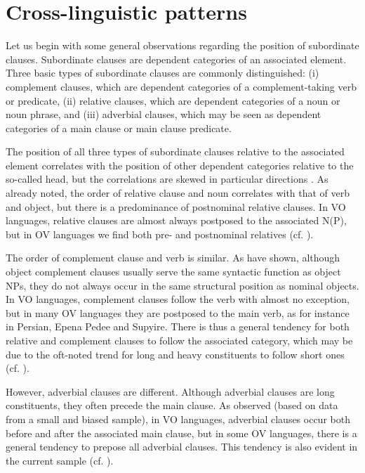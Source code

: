 \documentclass[output=paper]{langsci/langscibook}
\begin{document}
\section{Cross-linguistic patterns}

Let us begin with some general observations regarding the position of subordinate clauses. Subordinate clauses are dependent categories of an associated element. Three basic types of subordinate clauses are commonly distinguished: 
(i) complement clauses, which are dependent categories of a complement-taking verb or predicate, 
(ii) relative clauses, which are dependent categories of a noun or noun phrase, and 
(iii) adverbial clauses, which may be seen as dependent categories of a main clause or main clause predicate. 

The position of all three types of subordinate clauses relative to the associated element correlates with the position of other dependent categories relative to the so-called head, but the correlations are skewed in particular directions \citep{Diessel2001}. As \citet{Greenberg1963} already noted, the order of relative clause and noun correlates with that of verb and object, but there is a predominance of postnominal relative clauses. In VO languages, relative clauses are almost always postposed to the associated N(P), but in OV languages we find both pre- and postnominal relatives (cf. \citealt{Dryer2005}). 

The order of complement clause and verb is similar. As \citet{Schmidtke-BodeDiessel2017} have shown, although object complement clauses usually serve the same syntactic function as object NPs, they do not always occur in the same structural position as nominal objects. In VO languages, complement clauses follow the verb with almost no exception, but in many OV languages they are postposed to the main verb, as for instance in Persian, Epena Pedee and Supyire. There is thus a general tendency for both relative and complement clauses to follow the associated category, which may be due to the oft-noted trend for long and heavy constituents to follow short ones (cf. \citealt{Behaghel1932}).

However, adverbial clauses are different. Although adverbial clauses are long constituents, they often precede the main clause. As \citet{Diessel2001} observed (based on data from a small and biased sample), in VO languages, adverbial clauses occur both before and after the associated main clause, but in some OV languages, there is a general tendency to prepose all adverbial clauses. This tendency is also evident in the current sample (cf. ).
\end{document}
